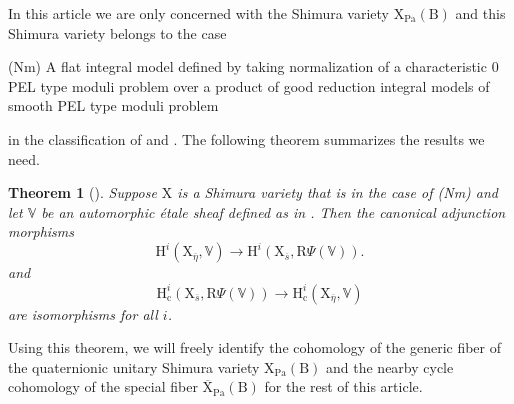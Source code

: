 \documentclass[10pt]{amsart}
\numberwithin{equation}{section}
\newtheorem{theorem}[equation]{Theorem}
\theoremstyle{definition}
\def\Pa{\mathrm{Pa}}
\def\rmc{\mathrm{c}}
\def\rmB{\mathrm{B}}
\def\rmH{\mathrm{H}}
\def\rmR{\mathrm{R}}
\def\rmX{\mathrm{X}}
\begin{document}
In this article we are only concerned with the Shimura variety $\rmX_{\Pa}(\rmB)$ and this Shimura variety belongs to the case 
\begin{center}
(Nm) {A flat integral model defined by taking normalization of a characteristic $0$ PEL type moduli problem over a product of  good reduction integral models of smooth PEL type moduli problem} 
\end{center}
in the classification of \cite{LS18a} and \cite{LS18b}. The following theorem summarizes the results we need. 
\begin{theorem}[{\cite[Corollary 4.6]{LS18b}}]
Suppose $\rmX$ is a Shimura variety that is in the case of (Nm) and let $\mathbb{V}$ be an automorphic \'etale sheaf defined as in \cite[\S 3]{LS18b}. Then the canonical adjunction morphisms
\begin{equation*}
\rmH^{i}(\rmX_{\overline{\eta}}, \mathbb{V})\rightarrow \rmH^{i}(\rmX_{\overline{s}}, \rmR\Psi(\mathbb{V})).
\end{equation*}
and
\begin{equation*}
\rmH^{i}_{\rmc}(\rmX_{\overline{s}}, \rmR\Psi(\mathbb{V}))\rightarrow \rmH^{i}_{\rmc}(\rmX_{\overline{\eta}}, \mathbb{V})
\end{equation*}
are isomorphisms for all $i$. 
\end{theorem}
Using this theorem, we will freely identify the cohomology of the generic fiber of the quaternionic unitary Shimura variety $\rmX_{\Pa}(\rmB)$ and the nearby cycle cohomology of the special fiber $\overline{\rmX}_{\Pa}(\rmB)$ for the rest of this article.
\end{document}
